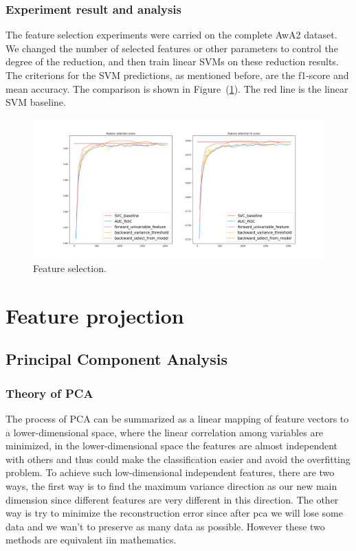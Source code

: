 \documentclass{article}
\begin{document}
\subsubsection{Experiment result and analysis}
The feature selection experiments were carried on the complete AwA2 dataset. We changed the number of selected features or other parameters to control the degree of the reduction, and then train linear SVMs on these reduction results. The criterions for the SVM predictions, as mentioned before, are the f1-score and mean accuracy. The comparison is shown in Figure~(\ref{fig:complete}). The red line is the linear SVM baseline.
\begin{figure}
	\label{fig:complete}
	\caption{Feature selection.}
	\includegraphics[width=\linewidth]{figs/feature_selection.png}
\end{figure}


\section{Feature projection}
\label{sec:projection}
\subsection{Principal Component Analysis}
\subsubsection{Theory of PCA}
The process of PCA can be summarized as a linear mapping of feature vectors to a lower-dimensional space, where the linear correlation among variables are minimized, in the lower-dimensional space the features are almost independent with others and thus could make the classification easier and avoid the overfitting problem. To achieve such low-dimensional independent features, there are two ways, the first way is to find the maximum variance direction as our new main dimension since different features are very different in this direction. The other way is try to minimize the reconstruction error since after pca we will lose some data and we wan't to preserve as many data as possible. However these two methods are equivalent iin mathematics.
\end{document}
